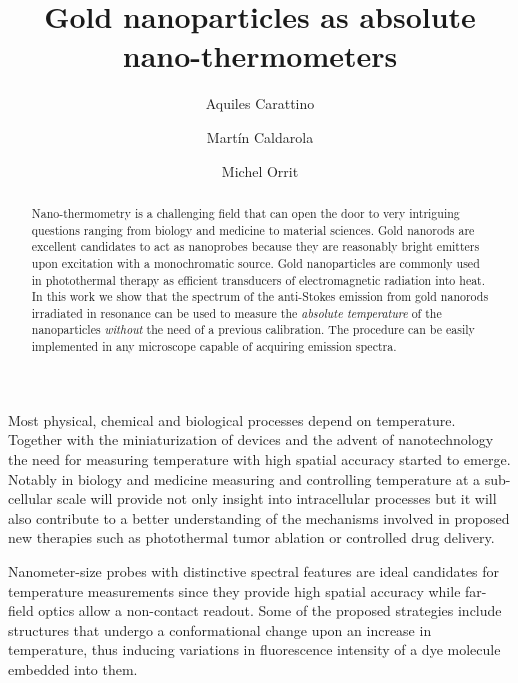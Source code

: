 \documentclass[journal=nalefd,manuscript=letter]{achemso}
\author{Aquiles Carattino}
\affiliation[Leiden]
{Huygens-Kamerlingh Onnes Lab, 2300RA Leiden, The Netherlands}
\author{Mart\'in Caldarola}
\affiliation[Leiden]
{Huygens-Kamerlingh Onnes Lab, 2300RA Leiden, The Netherlands}
\author{Michel Orrit}
\affiliation[Leiden]
{Huygens-Kamerlingh Onnes Lab, 2300RA Leiden, The Netherlands}
\title{Gold nanoparticles as absolute nano-thermometers}
\begin{document}
\maketitle

\begin{abstract}
Nano-thermometry is a challenging field that can open the door
to very intriguing questions ranging from biology and medicine to material sciences.
Gold nanorods are excellent candidates to act as nanoprobes because they are
reasonably bright emitters upon excitation with a monochromatic source.
Gold nanoparticles are commonly used in photothermal therapy as efficient
transducers of electromagnetic radiation into heat. In this work we show that
the spectrum of the anti-Stokes emission from gold nanorods irradiated in
resonance can be used to measure the \textit{absolute temperature} of the nanoparticles 
\textit{without} the need of a previous calibration.
The procedure can be easily implemented in any microscope capable of acquiring emission spectra. 

\end{abstract}


Most physical, chemical and biological processes depend on
temperature. Together with the miniaturization of devices and the advent of
nanotechnology the need for measuring temperature with high spatial accuracy
started to emerge. Notably in biology\cite{Yang2011a,Hrelescu2010} and
medicine\cite{Li2013c} measuring and controlling temperature at a sub-cellular scale
will provide not only insight into intracellular processes but it will
also contribute to a better understanding of the mechanisms involved in proposed
new therapies such as photothermal tumor ablation\cite{Gobin2007} or controlled
drug delivery\cite{Huang2006,Huo2014}.

Nanometer-size probes with distinctive spectral features are ideal candidates
for temperature measurements since they provide high spatial accuracy while
far-field optics allow a non-contact readout. Some of the proposed strategies
include structures that undergo a conformational change upon an increase in
temperature\cite{Ebrahimi2014}, thus inducing variations in fluorescence
intensity of a dye molecule embedded into them.
\end{document}
